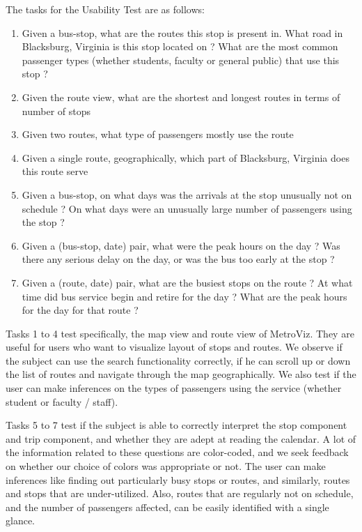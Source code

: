 \documentclass[journal]{vgtc}                %
\begin{document}
The tasks for the Usability Test are as follows: 
\begin{enumerate}
  \item Given a bus-stop, what are the routes this stop is present in. What road in Blacksburg, Virginia is this stop located on ? What are the most common passenger types (whether students, faculty or general public) that use this stop ?
  \item Given the route view, what are the shortest and longest routes in terms of number of stops
  \item Given two routes, what type of passengers mostly use the route
  \item Given a single route, geographically, which part of Blacksburg, Virginia does this route serve
  \item Given a bus-stop, on what days was the arrivals at the stop unusually not on schedule ? On what days were an unusually large number of passengers using the stop ?
  \item Given a (bus-stop, date) pair, what were the peak hours on the day ? Was there any serious delay on the day, or was the bus too early at the stop ?
  \item Given a (route, date) pair, what are the busiest stops on the route ? At what time did bus service begin and retire for the day ? What are the peak hours for the day for that route ?
\end{enumerate}

Tasks 1 to 4 test specifically, the map view and route view of MetroViz. They are useful for users who want to visualize layout of stops and routes. We observe if the subject can use the search functionality correctly, if he can scroll up or down the list of routes and navigate through the map geographically. We also test if the user can make inferences on the types of passengers using the service (whether student or faculty / staff). 

Tasks 5 to 7 test if the subject is able to correctly interpret the stop component and trip component, and whether they are adept at reading the calendar. A lot of the information related to these questions are color-coded, and we seek feedback on whether our choice of colors was appropriate or not. The user can make inferences like finding out particularly busy stops or routes, and similarly, routes and stops that are under-utilized. Also, routes that are regularly not on schedule, and the number of passengers affected, can be easily identified with a single glance.
\end{document}
